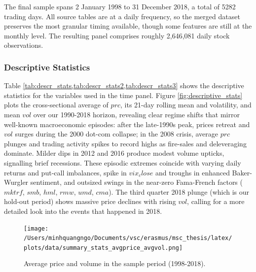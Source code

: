 The final sample spans 2 January 1998 to 31 December 2018, a total of 5282 trading days. All source tables are at a daily frequency, so the merged dataset preserves the most granular timing available, though some features are still at the monthly level. The resulting panel comprises roughly 2,646,081 daily stock observations. 

\subsubsection{Descriptive Statistics}
Table \cref{tab:descr_stats,tab:descr_stats2,tab:descr_stats3} shows the descriptive statistics for the variables used in the time panel. Figure \ref{fig:descriptive_stats} plots the cross-sectional average of $prc$, its 21-day rolling mean and volatility, and mean $vol$ over our 1990-2018 horizon, revealing clear regime shifts that mirror well-known macroeconomic episodes: after the late-1990s peak, prices retreat and $vol$ surges during the 2000 dot-com collapse; in the 2008 crisis, average $prc$ plunges and trading activity spikes to record highs as fire-sales and deleveraging dominate. Milder dips in 2012 and 2016 produce modest volume upticks, signalling brief recessions. These episodic extremes coincide with varying daily returns and put-call imbalances, spike in $vix_close$ and troughs in enhanced Baker-Wurgler sentiment, and outsized swings in the near-zero Fama-French factors ($mktrf$, $smb$, $hml$, $rmw$, $umd$, $cma$). The third quarter 2018 plunge (which is our hold-out period) shows massive price declines with rising $vol$, calling for a more detailed look into the events that happened in 2018. 


\begin{figure}[H]
    \centering
    \texttt{[image: /Users/minhquangngo/Documents/vsc/erasmus/msc\_thesis/latex/plots/data/summary\_stats\_avgprice\_avgvol.png]}
    \caption{Average price and volume in the sample period (1998-2018).}
    \label{fig:avgprice_avgvol}
\end{figure}

